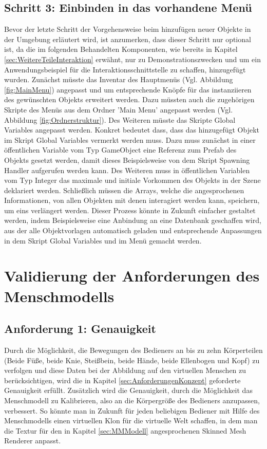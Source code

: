 \subsection{Schritt 3: Einbinden in das vorhandene Menü}\label{sec:ObjekteEinbinden3}
Bevor der letzte Schritt der Vorgehensweise beim hinzufügen neuer Objekte in der Umgebung erläutert wird, ist anzumerken, dass dieser Schritt nur optional ist, da die im folgenden Behandelten Komponenten, wie bereits in Kapitel \ref{sec:WeitereTeileInteraktion} erwähnt, nur zu Demonstrationszwecken und um ein Anwendungsbeispiel für die Interaktionsschnittstelle zu schaffen, hinzugefügt wurden. Zunächst müsste das Inventar des Hauptmenüs (Vgl. Abbildung \ref{fig:MainMenu}) angepasst und um entsprechende Knöpfe für das instanziieren des gewünschten Objekts erweitert werden. Dazu müssten auch die zugehörigen Skripte des Menüs aus dem Ordner 'Main Menu' angepasst werden (Vgl. Abbildung \ref{fig:Ordnerstruktur}). Des Weiteren müsste das Skripte Global Variables angepasst werden. Konkret bedeutet dass, dass das hinzugefügt Objekt im Skript Global Variables vermerkt werden muss. Dazu muss zunächst in einer öffentlichen Variable vom Typ GameObject eine Referenz zum Prefab des Objekts gesetzt werden, damit dieses Beispielsweise von dem Skript Spawning Handler aufgerufen werden kann. Des Weiteren muss in öffentlichen Variablen vom Typ Integer das maximale und initiale Vorkommen des Objekts in der Szene deklariert werden. Schließlich müssen die Arrays, welche die angesprochenen Informationen, von allen Objekten mit denen interagiert werden kann, speichern, um eins verlängert werden. Dieser Prozess könnte in Zukunft einfacher gestaltet werden, indem Beispielsweise eine Anbindung an eine Datenbank geschaffen wird, aus der alle Objektvorlagen automatisch geladen und entsprechende Anpassungen in dem Skript Global Variables und im Menü gemacht werden.

\section{Validierung der Anforderungen des Menschmodells}\label{sec:ValidMensch}

\subsection{Anforderung 1: Genauigkeit}
Durch die Möglichkeit, die Bewegungen des Bedieners an bis zu zehn Körperteilen (Beide Füße, beide Knie, Steißbein, beide Hände, beide Ellenbogen und Kopf) zu verfolgen und diese Daten bei der Abbildung auf den virtuellen Menschen zu berücksichtigen, wird die in Kapitel \ref{sec:AnforderungenKonzept} geforderte Genauigkeit erfüllt. Zusätzlich wird die Genauigkeit, durch die Möglichkeit das Menschmodell zu Kalibrieren, also an die Körpergröße des Bedieners anzupassen, verbessert. So könnte man in Zukunft für jeden beliebigen Bediener mit Hilfe des Menschmodells einen virtuellen Klon für die virtuelle Welt schaffen, in dem man die Textur für den in Kapitel \ref{sec:MMModell} angesprochenen Skinned Mesh Renderer anpasst.

